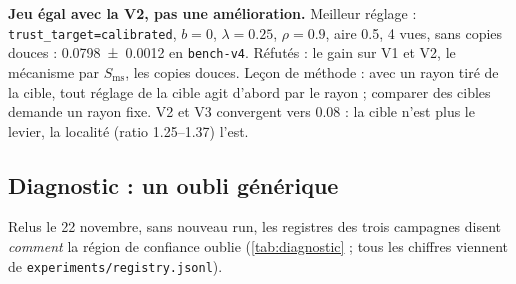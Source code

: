 \documentclass[11pt,a4paper]{article}
\newcommand{\code}[1]{\texttt{#1}}
\newcommand{\chemin}[1]{\nolinkurl{#1}}%
\begin{document}
\begin{retenir}
\textbf{Jeu égal avec la V2, pas une amélioration.} Meilleur réglage : \code{trust\_target=calibrated},
$b=0$, $\lambda=\num{0.25}$, $\rho=\num{0.9}$, aire \num{0.5}, 4 vues, sans copies douces :
\num{0.0798 +- 0.0012} en \code{bench-v4}. Réfutés : le gain sur V1 et V2, le mécanisme par
$S_{\text{ms}}$, les copies douces. Leçon de méthode : avec un rayon tiré de la cible, tout réglage
de la cible agit d'abord par le rayon ; comparer des cibles demande un rayon fixe. V2 et V3
convergent vers \num{0.08} : la cible n'est plus le levier, la localité (ratio
\numrange{1.25}{1.37}) l'est.
\end{retenir}

\subsection{Diagnostic : un oubli générique}\label{sec:diagnostic}
Relus le 22 novembre, sans nouveau run, les registres des trois campagnes disent \emph{comment}
la région de confiance oublie (\cref{tab:diagnostic} ; tous les chiffres viennent de
\chemin{experiments/registry.jsonl}).
\end{document}
